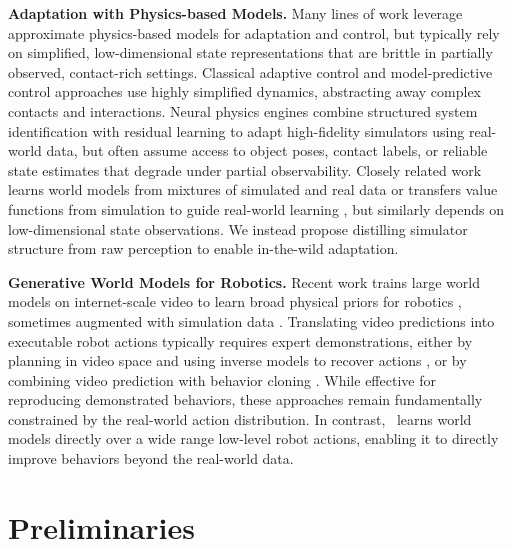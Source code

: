 \textbf{Adaptation with Physics-based Models.} Many lines of work leverage approximate physics-based models for adaptation and control, but typically rely on simplified, low-dimensional state representations that are brittle in partially observed, contact-rich settings. Classical adaptive control \cite{aastrom1995adaptive, slotine1987adaptive, ioannou1996robust} and model-predictive control \cite{morari1999model, 8594448} approaches use highly simplified dynamics, abstracting away complex contacts and interactions. Neural physics engines \cite{xu2025neural, pfrommer2021contactnets} combine structured system identification with residual learning to adapt high-fidelity simulators using real-world data, but often assume access to object poses, contact labels, or reliable state estimates that degrade under partial observability. Closely related work learns world models from mixtures of simulated and real data \cite{li2025offline, xiao2025anycar} or transfers value functions from simulation to guide real-world learning \cite{westenbroek2022lyapunovdesignrobustefficient, yin2025rapidly}, but similarly depends on low-dimensional state observations. We instead propose distilling simulator structure from raw perception to enable in-the-wild adaptation. 



\textbf{Generative World Models for Robotics.} Recent work trains large  world models on internet-scale video to learn broad physical priors for robotics \cite{yang2023learning, bruce2024genie, parkerholder2024genie2}, sometimes augmented with simulation data \cite{yang2023learning}. Translating video predictions into executable robot actions typically requires expert demonstrations, either by planning in video space and using inverse models to recover actions \cite{xie2025latent, jang2025dreamgen}, or by combining video prediction with behavior cloning \cite{zhu2025unified, li2025unified, cheang2024gr}. While effective for reproducing demonstrated behaviors, these approaches remain fundamentally constrained by the real-world action distribution. In contrast, \Method\ learns world models directly over a wide range low-level robot actions, enabling it to directly improve behaviors beyond the real-world data.

\section{ Preliminaries}


